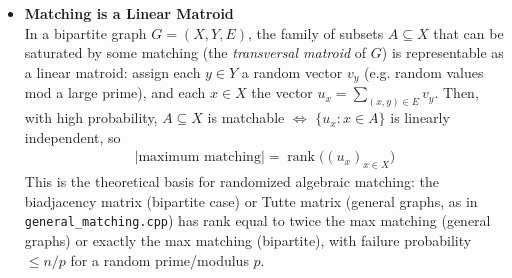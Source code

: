 \begin{itemize}
    \item \textbf{Matching is a Linear Matroid} \\
    In a bipartite graph $G=(X,Y,E)$, the family of subsets $A \subseteq X$ that can be
    saturated by some matching (the \emph{transversal matroid} of $G$) is representable as a
    linear matroid: assign each $y \in Y$ a random vector $v_y$ (e.g. random values mod a large
    prime), and each $x \in X$ the vector $u_x = \sum_{(x,y)\in E} v_y$. Then, with high
    probability, $A \subseteq X$ is matchable $\iff$ $\{u_x : x \in A\}$ is linearly independent, so
    \begin{equation*}
    \begin{aligned}
    |\text{maximum matching}| = \operatorname{rank}\big((u_x)_{x \in X}\big)
    \end{aligned}
    \end{equation*}
    This is the theoretical basis for randomized algebraic matching: the biadjacency matrix
    (bipartite case) or Tutte matrix (general graphs, as in \texttt{general\_matching.cpp}) has
    rank equal to twice the max matching (general graphs) or exactly the max matching
    (bipartite), with failure probability $\leq n / p$ for a random prime/modulus $p$.
\end{itemize}
